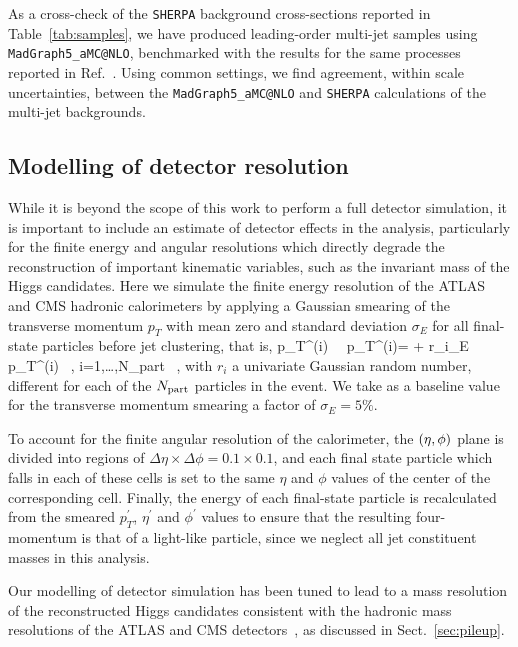 As a cross-check of the {\tt SHERPA}
background cross-sections reported in Table~\ref{tab:samples}, we have produced leading-order
multi-jet samples
using {\tt MadGraph5\_aMC@NLO},
benchmarked with the results for the same processes reported in
Ref.~\cite{Alwall:2014hca}.
%
Using common settings, we find
agreement, within scale uncertainties,  between the
{\tt MadGraph5\_aMC@NLO} and {\tt SHERPA} calculations of
the multi-jet backgrounds.

\subsection{Modelling of detector resolution}
\label{sec:detectormodeling}

While it is beyond the scope of this work to perform a full
detector simulation, it is important to include an estimate of detector
effects in the analysis, particularly for the finite energy
and angular resolutions which directly
degrade the reconstruction of important kinematic variables, such as
the invariant mass of the Higgs candidates.
%
Here we simulate the finite energy resolution of the ATLAS and CMS
hadronic calorimeters by applying a Gaussian smearing of the transverse
momentum $p_T$ with mean zero and standard deviation $\sigma_E$ for all
final-state particles before jet clustering, that is,
%
\be
\label{eq:smearing}
p_T^{(i)} \, \to \, p_T^{(i)\prime}= + r_i\cdot\sigma_E \rp\, p_T^{(i)} \, , \quad
i=1,\ldots,N_{\rm part} \, ,
\ee
with $r_i$ a univariate Gaussian random number, different for each
of the $N_{\rm part}$ particles in the event.
%
We take as a baseline value for the transverse momentum smearing a
factor of $\sigma_E=5\%$.
%

To account for the finite angular resolution of the calorimeter,
the $\left( \eta,\phi\right)$ plane is divided into regions of
$\Delta \eta \times \Delta \phi=0.1\times 0.1$,
and each final state particle
which falls in each of these cells is set to the same $\eta$
and $\phi$ values of the center of the
corresponding cell.
%
Finally, the energy
of each final-state particle
is recalculated from the smeared $p_T^\prime$,
$\eta^\prime$ and $\phi^\prime$ values to ensure that the resulting
four-momentum is that of a light-like particle, since we neglect all
jet constituent masses in this analysis.

Our modelling of detector simulation has been tuned
to lead to a mass resolution of
the reconstructed Higgs candidates consistent
with the hadronic mass resolutions of the
ATLAS and CMS detectors~\cite{Aad:2012gxa,Chatrchyan:2013zna,Aad:2014xzb},
as discussed in Sect.~\ref{sec:pileup}.

